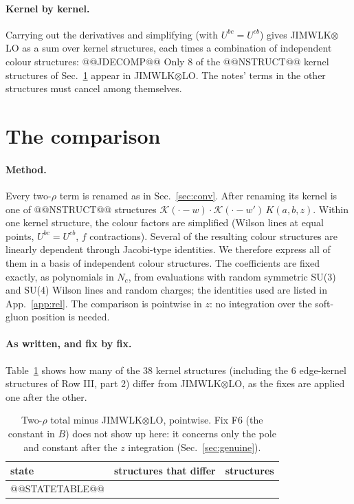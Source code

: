 \documentclass[10pt]{article}
\numberwithin{equation}{section}
\newcommand{\KK}{\mathcal K}
\begin{document}
\paragraph{Kernel by kernel.} Carrying out the derivatives and simplifying (with $U^{bc}=U^{cb}$) gives JIMWLK$\otimes$LO as a sum over kernel structures, each times a combination of independent colour structures:
@@JDECOMP@@
Only 8 of the @@NSTRUCT@@ kernel structures of Sec.~\ref{sec:match} appear in JIMWLK$\otimes$LO. The notes' terms in the other structures must cancel among themselves.

\section{The comparison}\label{sec:match}
\paragraph{Method.} Every two-$\rho$ term is renamed as in Sec.~\ref{sec:conv}. After renaming its kernel is one of @@NSTRUCT@@ structures $\KK(\cdot-w)\cdot\KK(\cdot-w')\,K(a,b,z)$. Within one kernel structure, the colour factors are simplified (Wilson lines at equal points, $U^{bc}=U^{cb}$, $f$ contractions). Several of the resulting colour structures are linearly dependent through Jacobi-type identities. We therefore express all of them in a basis of independent colour structures. The coefficients are fixed exactly, as polynomials in $N_c$, from evaluations with random symmetric SU(3) and SU(4) Wilson lines and random charges; the identities used are listed in App.~\ref{app:rel}. The comparison is pointwise in $z$: no integration over the soft-gluon position is needed.

\paragraph{As written, and fix by fix.} Table~\ref{tab:states} shows how many of the 38 kernel structures (including the 6 edge-kernel structures of Row III, part 2) differ from JIMWLK$\otimes$LO, as the fixes are applied one after the other.
\begin{table}[h]
\centering\small
\begin{tabular}{@{}l c c@{}}
state & structures that differ & structures\\ \hline
@@STATETABLE@@
\end{tabular}
\caption{Two-$\rho$ total minus JIMWLK$\otimes$LO, pointwise. Fix F6 (the constant in $B$) does not show up here: it concerns only the pole and constant after the $z$ integration (Sec.~\ref{sec:genuine}).}
\label{tab:states}
\end{table}
\end{document}
